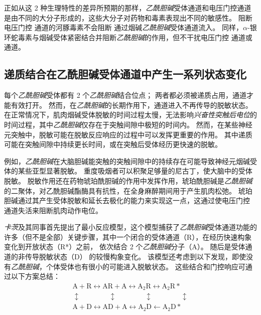 正如从这 2 种生理特性的差异所预期的那样，\textit{乙酰胆碱}受体通道和电压门控通道是由不同的大分子形成的，这些大分子对药物和毒素表现出不同的敏感性。
阻断电压门控  通道的河豚毒素不会阻断  通过烟碱\textit{乙酰胆碱}受体通道流入。
同样，$\alpha$-银环蛇毒素与烟碱受体紧密结合并阻断\textit{乙酰胆碱}的作用，但不干扰电压门控  通道或  通道。



\subsection{递质结合在乙酰胆碱受体通道中产生一系列状态变化}

每个\textit{乙酰胆碱}受体都有 2 个\textit{乙酰胆碱}结合位点；
两者都必须被递质占用，通道才能有效打开。
然而，在\textit{乙酰胆碱}的长期作用下，通道进入不再传导的脱敏状态。
在正常情况下，肌肉烟碱受体脱敏的时间过程太慢，无法影响\textit{兴奋性突触后电位}的时间过程，其中\textit{乙酰胆碱}仅存在于突触间隙中极短的时间内。
然而，在某些神经元突触中，脱敏可能在脱敏反应响应的过程中可以发挥更重要的作用。
其中递质可能在突触间隙中持续更长时间，或在突触后受体经历更快速的脱敏。


例如，\textit{乙酰胆碱}在大脑胆碱能突触的突触间隙中的持续存在可能导致神经元烟碱受体的某些亚型显著脱敏。
重度吸烟者可以积聚足够量的尼古丁，使大脑中的受体脱敏。
脱敏作用还在药物琥珀酰胆碱的作用中发挥作用，琥珀酰胆碱是\textit{乙酰胆碱}的二聚体，对乙酰胆碱酯酶具有抗性，在全身麻醉期间用于产生肌肉松弛。
琥珀胆碱通过其产生受体脱敏和延长去极化的能力来实现这一点，这通过使电压门控  通道失活来阻断肌肉动作电位。


\textit{卡茨}及其同事首先提出了最小反应模型，这个模型捕获了\textit{乙酰胆碱}受体通道功能的许多（但不是全部）关键步骤，其中一个闭合的受体通道（R），在经历快速构象变化到开放状态（R*）之前， 依次结合 2 个\textit{乙酰胆碱}分子（A）。
随后是受体通道的非传导脱敏状态（D） 的较慢构象变化。
该模型还考虑到以下发现，即使没有\textit{乙酰胆碱}，个体受体也有很小的可能进入脱敏状态。
这些结合和门控响应可通过以下方案总结：
\begin{align*} \label{binding_gating_reactions}
	\text{A}+\text{R} \leftrightarrow \text{AR} + \text{A} \leftrightarrow \text{A}_2 \text{R} \leftrightarrow \text{A}_2 \text{R} *  \\
	\updownarrow \qquad \qquad \updownarrow \qquad \qquad \updownarrow \qquad \qquad \updownarrow  \\ 
	\text{A}+\text{D} \leftrightarrow \text{AD} + \text{A} \leftrightarrow \text{A}_2 \text{D} \leftarrow \text{A}_2 \text{D} * \nonumber
\end{align*}


